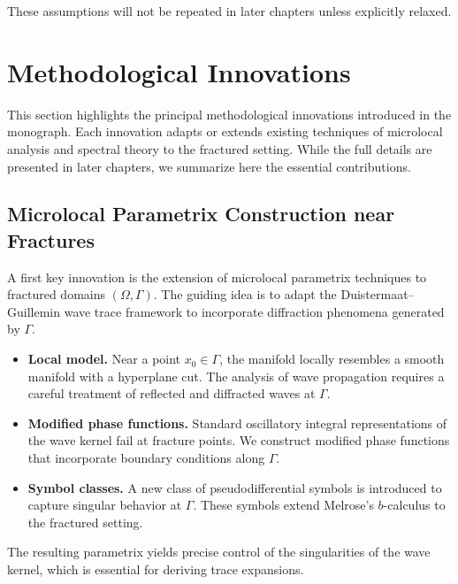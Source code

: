 These assumptions will not be repeated in later chapters unless explicitly
relaxed.


\section{Methodological Innovations}

This section highlights the principal methodological innovations introduced in
the monograph. Each innovation adapts or extends existing techniques of
microlocal analysis and spectral theory to the fractured setting. While the
full details are presented in later chapters, we summarize here the essential
contributions.

\subsection{Microlocal Parametrix Construction near Fractures}

A first key innovation is the extension of microlocal parametrix techniques to
fractured domains $(\Omega,\Gamma)$. The guiding idea is to adapt the
Duistermaat--Guillemin wave trace framework to incorporate diffraction
phenomena generated by $\Gamma$.

\begin{itemize}
  \item \textbf{Local model.} Near a point $x_0 \in \Gamma$, the manifold
  locally resembles a smooth manifold with a hyperplane cut. The analysis of
  wave propagation requires a careful treatment of reflected and diffracted
  waves at $\Gamma$.
  \item \textbf{Modified phase functions.} Standard oscillatory integral
  representations of the wave kernel fail at fracture points. We construct
  modified phase functions that incorporate boundary conditions along $\Gamma$.
  \item \textbf{Symbol classes.} A new class of pseudodifferential symbols is
  introduced to capture singular behavior at $\Gamma$. These symbols extend
  Melrose's $b$-calculus to the fractured setting.
\end{itemize}

The resulting parametrix yields precise control of the singularities of the
wave kernel, which is essential for deriving trace expansions.

